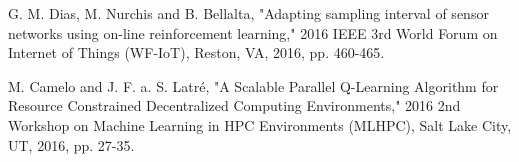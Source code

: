 \documentclass[journal]{IEEEtran}
\begin{document}
\begin{thebibliography}{1}
G. M. Dias, M. Nurchis and B. Bellalta, "Adapting sampling interval of sensor networks using on-line reinforcement learning," 2016 IEEE 3rd World Forum on Internet of Things (WF-IoT), Reston, VA, 2016, pp. 460-465.

M. Camelo and J. F. a. S. Latré, "A Scalable Parallel Q-Learning Algorithm for Resource Constrained Decentralized Computing Environments," 2016 2nd Workshop on Machine Learning in HPC Environments (MLHPC), Salt Lake City, UT, 2016, pp. 27-35.

\end{thebibliography}


\end{document}
